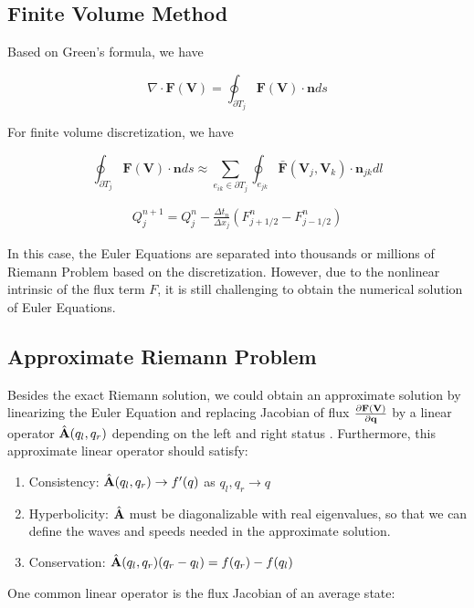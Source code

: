 \documentclass[11pt]{diazessay} %
\begin{document}
\subsection{Finite Volume Method}
Based on Green's formula, we have

$$
\nabla\cdot \textbf{F}(\textbf{V}) = \oint_{\partial T_j} \textbf{F}(\textbf{V})\cdot \textbf{n} ds
$$

For finite volume discretization, we have\cite{li_multigrid_nodate}

$$
\oint_{\partial T_j} \textbf{F}(\textbf{V})\cdot \textbf{n} ds 
\approx \sum_{e_{ik}\in \partial T_j} \oint_{e_{jk}} \bar{\textbf{F}}(\textbf{V}_j, \textbf{V}_k)\cdot \textbf{n}_{jk} dl
$$


\begin{align}
    Q_j^{n+1} = Q_j^n - \frac{\Delta t_n}{\Delta x_j} (F_{j+1/2}^n - F_{j-1/2}^n)
\end{align}

In this case, the Euler Equations are separated into thousands or millions of Riemann Problem based on the discretization. However, due to the nonlinear intrinsic of the flux term $F$, it is still challenging to obtain the numerical solution of Euler Equations.

\subsection{Approximate Riemann Problem}

Besides the exact Riemann solution, we could obtain an approximate solution by linearizing the Euler Equation and replacing Jacobian of flux $\frac{\partial \bf{F}(\bf{V})}{\partial \bf{q}}$ by a linear operator $\hat{\bf{A}}(q_l, q_r)$ depending on the left and right status \cite{roe_approximate_1981}. Furthermore, this approximate linear operator should satisfy:


\begin{enumerate}

\item Consistency: $\hat{\bf{A}}(q_l, q_r) \rightarrow f'(q)$ as $q_l, q_r \rightarrow q$
\item Hyperbolicity: $\hat{\bf{A}}$ must be diagonalizable with real eigenvalues, so that we can define the waves and speeds needed in the approximate solution.
\item Conservation: $\hat{\bf{A}}(q_l, q_r)(q_r-q_l) = f(q_r) - f(q_l)$
\end{enumerate}


One common linear operator is the flux Jacobian of an average state:
\end{document}

